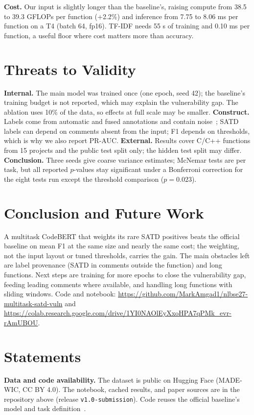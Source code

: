 \documentclass[conference]{IEEEtran}
\begin{document}
\textbf{Cost.} Our input is slightly longer than the baseline's, raising compute from 38.5 to 39.3 GFLOPs per function (+2.2\%) and inference from 7.75 to 8.06 ms per function on a T4 (batch 64, fp16). TF-IDF needs 55 s of training and 0.10 ms per function, a useful floor where cost matters more than accuracy.

\section{Threats to Validity}
\textbf{Internal.} The main model was trained once (one epoch, seed 42); the baseline's training budget is not reported, which may explain the vulnerability gap. The ablation uses 10\% of the data, so effects at full scale may be smaller. \textbf{Construct.} Labels come from automatic and fused annotations and contain noise~\cite{croft2023}; SATD labels can depend on comments absent from the input; F1 depends on thresholds, which is why we also report PR-AUC. \textbf{External.} Results cover C/C++ functions from 15 projects and the public test split only; the hidden test split may differ. \textbf{Conclusion.} Three seeds give coarse variance estimates; McNemar tests are per task, but all reported $p$-values stay significant under a Bonferroni correction for the eight tests run except the threshold comparison ($p=0.023$).

\section{Conclusion and Future Work}
A multitask CodeBERT that weights its rare SATD positives beats the official baseline on mean F1 at the same size and nearly the same cost; the weighting, not the input layout or tuned thresholds, carries the gain. The main obstacles left are label provenance (SATD in comments outside the function) and long functions. Next steps are training for more epochs to close the vulnerability gap, feeding leading comments where available, and handling long functions with sliding windows. Code and notebook: \url{https://github.com/MarkAmgad1/nlbse27-multitask-satd-vuln} and \url{https://colab.research.google.com/drive/1YI0NAOlEyXxoHPA7qPMk_evr-rAmUBOU}.

\section*{Statements}
\textbf{Data and code availability.} The dataset is public on Hugging Face (MADE-WIC, CC BY 4.0). The notebook, cached results, and paper sources are in the repository above (release \texttt{v1.0-submission}). Code reuses the official baseline's model and task definition~\cite{nlbse27}.
\end{document}
